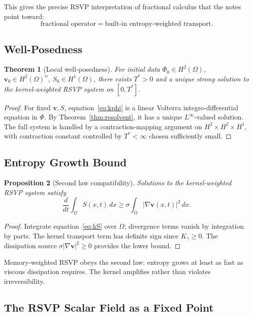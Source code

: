 \documentclass[12pt]{article}
\newtheorem{theorem}{Theorem}[section]
\newtheorem{proposition}[theorem]{Proposition}
\begin{document}
This gives the precise RSVP interpretation of fractional calculus that the
notes point toward:
\[
  \text{fractional operator} = \text{built-in entropy-weighted transport}.
\]

\subsection{Well-Posedness}

\begin{theorem}[Local well-posedness]
\label{thm:rsvp-wp}
For initial data $\Phi_0 \in H^2(\Omega)$, $\mathbf{v}_0 \in H^2(\Omega)^n$,
$S_0 \in H^1(\Omega)$, there exists $T^* > 0$ and a unique strong solution
to the kernel-weighted RSVP system on $[0,T^*]$.
\end{theorem}

\begin{proof}
For fixed $\mathbf{v}, S$, equation~\eqref{eq:kphi} is a linear Volterra
integro-differential equation in $\Phi$. By Theorem~\ref{thm:resolvent},
it has a unique $L^\infty$-valued solution. The full system is handled by
a contraction-mapping argument on $H^2\times H^2\times H^1$, with contraction
constant controlled by $T^* < \infty$ chosen sufficiently small.
\end{proof}

\subsection{Entropy Growth Bound}

\begin{proposition}[Second law compatibility]
\label{prop:entropy}
Solutions to the kernel-weighted RSVP system satisfy
\[
  \frac{d}{dt}\int_\Omega S(x,t)\, dx \geq
  \sigma\int_\Omega |\nabla\mathbf{v}(x,t)|^2\, dx.
\]
\end{proposition}

\begin{proof}
Integrate equation~\eqref{eq:kS} over $\Omega$; divergence terms vanish by
integration by parts. The kernel transport term has definite sign since
$K_\gamma \geq 0$. The dissipation source $\sigma|\nabla\mathbf{v}|^2 \geq 0$
provides the lower bound.
\end{proof}

Memory-weighted RSVP obeys the second law: entropy grows at least as fast
as viscous dissipation requires. The kernel amplifies rather than violates
irreversibility.

\subsection{The RSVP Scalar Field as a Fixed Point}
\end{document}
